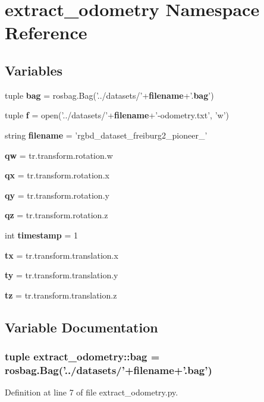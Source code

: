 \section{extract\-\_\-odometry \-Namespace \-Reference}
\label{namespaceextract__odometry}
\subsection*{\-Variables}
\begin{DoxyCompactItemize}
\item 
tuple {\bf bag} = rosbag.\-Bag('../datasets/'+{\bf filename}+'.{\bf bag}')
\item 
tuple {\bf f} = open('../datasets/'+{\bf filename}+'-\/odometry.\-txt', 'w')
\item 
string {\bf filename} = 'rgbd\-\_\-dataset\-\_\-freiburg2\-\_\-pioneer\-\_'
\item 
{\bf qw} = tr.\-transform.\-rotation.\-w
\item 
{\bf qx} = tr.\-transform.\-rotation.\-x
\item 
{\bf qy} = tr.\-transform.\-rotation.\-y
\item 
{\bf qz} = tr.\-transform.\-rotation.\-z
\item 
int {\bf timestamp} = 1
\item 
{\bf tx} = tr.\-transform.\-translation.\-x
\item 
{\bf ty} = tr.\-transform.\-translation.\-y
\item 
{\bf tz} = tr.\-transform.\-translation.\-z
\end{DoxyCompactItemize}


\subsection{\-Variable \-Documentation}
\subsubsection[{bag}]{\setlength{\rightskip}{0pt plus 5cm}tuple {\bf extract\-\_\-odometry\-::bag} = rosbag.\-Bag('../datasets/'+{\bf filename}+'.{\bf bag}')}\label{namespaceextract__odometry_a648f60786c1f73b475ed45f3903c845d}


\-Definition at line 7 of file extract\-\_\-odometry.\-py.


